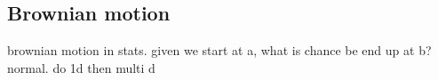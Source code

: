 
\subsection{Brownian motion}

brownian motion in stats. given we start at a, what is chance be end up at b? normal. do 1d then multi d


